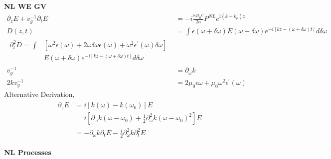 \documentclass[12pt]{article}
\begin{document}
\begin{multicols}{2}
  
  \textbf{NL WE GV}
  \begin{align}
      \partial_z E + v_g^{-1} \partial_t E &= -i \frac{\omega \mu_0 c}{2n} P^{NL} e^{i(k - k_p) z}\\
    D(z, t) &= \int \epsilon(\omega + \delta \omega) E(\omega + \delta \omega)
    e^{-i[kz - (\omega + \delta \omega)t]} d\delta\omega\\
    \begin{split}
      \partial_t^2 D = \int &[\omega^2 {}\epsilon(\omega) + 2 \omega \delta\omega \epsilon(\omega)
        + \omega^2 \epsilon^{\prime}(\omega) \delta\omega]\\
      &E(\omega + \delta\omega)
      e^{-i[kz - (\omega + \delta \omega)t]} d\delta\omega
    \end{split}\\
    v_g^{-1} &= \partial_\omega k\\
    2kv_g^{-1} &= 2\mu_0 \epsilon \omega + \mu_0 \omega^2 \epsilon^{\prime}(\omega)
  \end{align}
  Alternative Derivation,
  \begin{align}
    \begin{split}
      \partial_z E &= i[k(\omega) - k(\omega_0)] E\\
      &= i[\partial_{\omega} k (\omega - \omega_0) + \frac{1}{2}\partial_{\omega}^2 k (\omega - \omega_0)^2] E\\
      &= -\partial_{\omega} k \partial_t E - \frac{i}{2}\partial_{\omega}^2 k \partial^2_t E
    \end{split}
  \end{align}

  \textbf{NL Processes}
  

\end{multicols}
\end{document}
